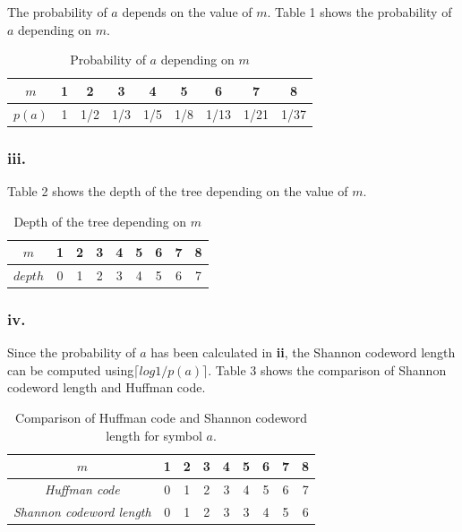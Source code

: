 \documentclass{article}
\begin{document}
The probability of $a$ depends on the value of $m$. Table 1 shows the probability of $a$ depending on $m$.

\begin{table}[h]
\centering
\begin{tabular}{|c | c c c c c c c c|}
\hline
$m$	&1	&2	&3	&4  &5  &6  &7  &8\\
\hline
$p(a)$	&1  &1/2  &1/3  &1/5  &1/8  &1/13  &1/21  &1/37\\
\hline
\end{tabular}
\caption{Probability of $a$ depending on $m$}
\end{table}



\subsubsection*{iii.}

Table 2 shows the depth of the tree depending on the value of $m$.

\begin{table}[h]
\centering
\begin{tabular}{|c | c c c c c c c c|}
\hline
$m$	&1	&2	&3	&4  &5  &6  &7  &8\\
\hline
$depth$	&0  &1  &2  &3  &4  &5  &6  &7\\
\hline
\end{tabular}
\caption{Depth of the tree depending on $m$}
\end{table}

\subsubsection*{iv.}

Since the probability of $a$ has been calculated in \textbf{ii}, the Shannon codeword length can be computed using$\lceil{log 1/p(a)}\rceil$. Table 3 shows the comparison of Shannon codeword length and Huffman code.

\begin{table}[h]
\centering
\begin{tabular}{|c | c c c c c c c c|}
\hline
$m$	&1	&2	&3	&4  &5  &6  &7  &8\\
\hline
\emph{Huffman code}  &0	&1	&2	&3	&4  &5  &6  &7\\
\hline
\emph{Shannon codeword length}	&0  &1  &2  &3  &3  &4  &5  &6\\
\hline
\end{tabular}
\caption{Comparison of Huffman code and Shannon codeword length for symbol $a$.}
\end{table}
\end{document}
